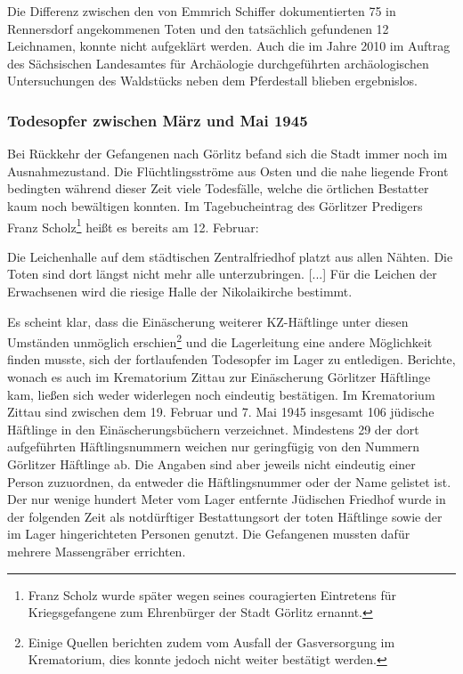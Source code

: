 Die Differenz zwischen den von Emmrich Schiffer dokumentierten 75 in Rennersdorf angekommenen Toten und den tatsächlich gefundenen 12 Leichnamen, konnte nicht aufgeklärt werden. Auch die im Jahre 2010 im Auftrag des Sächsischen Landesamtes für Archäologie durchgeführten archäologischen Untersuchungen des Waldstücks neben dem Pferdestall blieben ergebnislos.

\subsubsection{Todesopfer zwischen März und Mai 1945}

Bei Rückkehr der Gefangenen nach Görlitz befand sich die Stadt immer noch im Ausnahmezustand. Die Flüchtlingsströme aus Osten und die nahe liegende Front bedingten während dieser Zeit viele Todesfälle, welche die örtlichen Bestatter kaum noch bewältigen konnten. 
Im Tagebucheintrag des Görlitzer Predigers Franz Scholz\footnote{Franz Scholz wurde später wegen seines couragierten Eintretens für Kriegsgefangene zum Ehrenbürger der Stadt Görlitz ernannt.} heißt es bereits am 12. Februar:
\begin{leftbar}
Die Leichenhalle auf dem städtischen Zentralfriedhof platzt aus allen Nähten. Die Toten sind dort längst nicht mehr alle unterzubringen. [...] Für die Leichen der Erwachsenen wird die riesige Halle der Nikolaikirche bestimmt.
\end{leftbar}
\newpage
Es scheint klar, dass die Einäscherung weiterer KZ-Häftlinge unter diesen Umständen unmöglich erschien\footnote{Einige Quellen berichten zudem vom Ausfall der Gasversorgung im Krematorium, dies konnte jedoch nicht weiter bestätigt werden.} und die Lagerleitung eine andere Möglichkeit finden musste, sich der fortlaufenden Todesopfer im Lager zu entledigen.
\newline
Berichte, wonach es auch im Krematorium Zittau zur Einäscherung Görlitzer Häftlinge kam, ließen sich weder widerlegen noch eindeutig bestätigen. Im Krematorium Zittau sind zwischen dem 19. Februar und 7. Mai 1945 insgesamt 106 jüdische Häftlinge in den Einäscherungsbüchern verzeichnet. Mindestens 29 der dort aufgeführten Häftlingsnummern weichen nur geringfügig von den Nummern Görlitzer Häftlinge ab. Die Angaben sind aber jeweils nicht eindeutig einer Person zuzuordnen, da entweder die Häftlingsnummer oder der Name gelistet ist.
\newline
Der nur wenige hundert Meter vom Lager entfernte Jüdischen Friedhof wurde in der folgenden Zeit als notdürftiger Bestattungsort der toten Häftlinge sowie der im Lager hingerichteten Personen genutzt. Die Gefangenen mussten dafür mehrere Massengräber errichten. 
